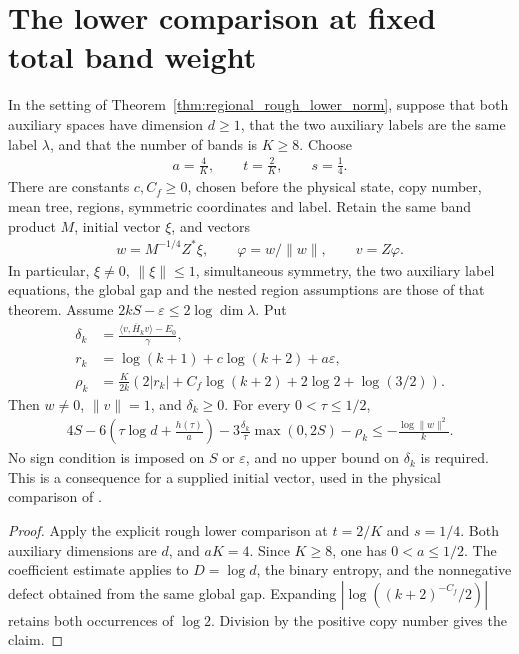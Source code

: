 \section{The lower comparison at fixed total band weight}

\begin{theorem}
    \label{thm:regional_rough_lower_three}
    \leanok
    In the setting of Theorem~\ref{thm:regional_rough_lower_norm}, suppose
    that both auxiliary spaces have dimension $d\geq1$, that the two
    auxiliary labels are the same label $\lambda$, and that the number
    of bands is $K\geq8$. Choose
    \begin{align*}
        a=\frac4K,\qquad t=\frac2K,\qquad s=\frac14.
    \end{align*}
    There are constants $c,C_f\geq0$, chosen before the physical state,
    copy number, mean tree, regions, symmetric coordinates and label.
    Retain the same band product $M$, initial vector $\xi$, and vectors
    \begin{align*}
        w=M^{-1/4}Z^*\xi,\qquad
        \varphi=w/\|w\|,\qquad v=Z\varphi.
    \end{align*}
    In particular, $\xi\ne0$, $\|\xi\|\leq1$, simultaneous symmetry,
    the two auxiliary label equations, the global gap and the nested
    region assumptions are those of that theorem. Assume
    $2kS-\varepsilon\leq2\log\dim\lambda$. Put
    \begin{align*}
        \delta_k & =\frac{\langle v,\overline H_kv\rangle-E_0}{\gamma}, \\
        r_k      & =\log(k+1)+c\log(k+2)+a\varepsilon,                  \\
        \rho_k   & =\frac{K}{2k}
        \left(2|r_k|+C_f\log(k+2)+2\log2+\log(3/2)\right).
    \end{align*}
    Then $w\ne0$, $\|v\|=1$, and $\delta_k\geq0$.
    For every $0<\tau\leq1/2$,
    \begin{align*}
        4S-6\left(\tau\log d+\frac{h(\tau)}a\right)
        -3\frac{\delta_k}{\tau}\max(0,2S)-\rho_k
        \leq-\frac{\log\|w\|^2}{k}.
    \end{align*}
    No sign condition is imposed on $S$ or $\varepsilon$, and no upper
    bound on $\delta_k$ is required. This is a consequence for a supplied
    initial vector, used in the physical comparison of
    \cite[Section~8]{OpenAI2026AreaLaw}.
\end{theorem}
\begin{proof}
    \leanok
    Apply the explicit rough lower comparison at $t=2/K$ and $s=1/4$.
    Both auxiliary dimensions are $d$, and $aK=4$.
    Since $K\geq8$, one has $0<a\leq1/2$.
    The coefficient estimate applies to $D=\log d$, the binary entropy,
    and the nonnegative defect obtained from the same global gap.
    Expanding $|\log((k+2)^{-C_f}/2)|$ retains both occurrences of
    $\log2$. Division by the positive copy number gives the claim.
\end{proof}
